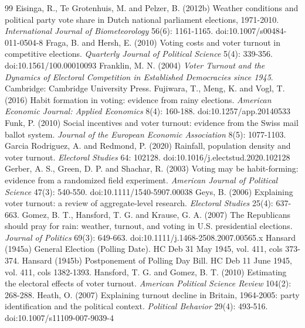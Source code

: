 \documentclass[11pt,a4paper]{article}
\begin{document}
\begin{thebibliography}{99}
 Eisinga, R., Te Grotenhuis, M. and Pelzer, B. (2012b) Weather conditions and political party vote share in Dutch national parliament elections, 1971-2010. \textit{International Journal of Biometeorology} 56(6): 1161-1165. doi:10.1007/s00484-011-0504-8
 Fraga, B. and Hersh, E. (2010) Voting costs and voter turnout in competitive elections. \textit{Quarterly Journal of Political Science} 5(4): 339-356. doi:10.1561/100.00010093
 Franklin, M. N. (2004) \textit{Voter Turnout and the Dynamics of Electoral Competition in Established Democracies since 1945}. Cambridge: Cambridge University Press.
 Fujiwara, T., Meng, K. and Vogl, T. (2016) Habit formation in voting: evidence from rainy elections. \textit{American Economic Journal: Applied Economics} 8(4): 160-188. doi:10.1257/app.20140533
 Funk, P. (2010) Social incentives and voter turnout: evidence from the Swiss mail ballot system. \textit{Journal of the European Economic Association} 8(5): 1077-1103.
 Garcia Rodriguez, A. and Redmond, P. (2020) Rainfall, population density and voter turnout. \textit{Electoral Studies} 64: 102128. doi:10.1016/j.electstud.2020.102128
 Gerber, A. S., Green, D. P. and Shachar, R. (2003) Voting may be habit-forming: evidence from a randomized field experiment. \textit{American Journal of Political Science} 47(3): 540-550. doi:10.1111/1540-5907.00038
 Geys, B. (2006) Explaining voter turnout: a review of aggregate-level research. \textit{Electoral Studies} 25(4): 637-663.
 Gomez, B. T., Hansford, T. G. and Krause, G. A. (2007) The Republicans should pray for rain: weather, turnout, and voting in U.S. presidential elections. \textit{Journal of Politics} 69(3): 649-663. doi:10.1111/j.1468-2508.2007.00565.x
 Hansard (1945a) General Election (Polling Date). HC Deb 31 May 1945, vol. 411, cols 373-374.
 Hansard (1945b) Postponement of Polling Day Bill. HC Deb 11 June 1945, vol. 411, cols 1382-1393.
 Hansford, T. G. and Gomez, B. T. (2010) Estimating the electoral effects of voter turnout. \textit{American Political Science Review} 104(2): 268-288.
 Heath, O. (2007) Explaining turnout decline in Britain, 1964-2005: party identification and the political context. \textit{Political Behavior} 29(4): 493-516. doi:10.1007/s11109-007-9039-4

\end{thebibliography}
\end{document}
